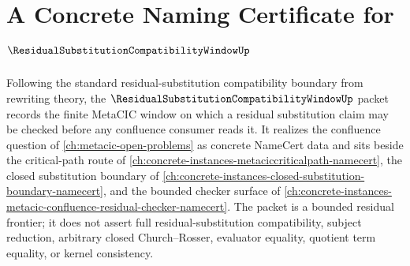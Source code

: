 \chapter{A Concrete Naming Certificate for $\ResidualSubstitutionCompatibilityWindowUp$}
\label{ch:concrete-instances-residual-substitution-compatibility-window-namecert}

Following the standard residual-substitution compatibility boundary from rewriting theory, the $\ResidualSubstitutionCompatibilityWindowUp$ packet records the finite MetaCIC window on which a residual substitution claim may be checked before any confluence consumer reads it. It realizes the confluence question of \autoref{ch:metacic-open-problems} as concrete NameCert data and sits beside the critical-path route of \autoref{ch:concrete-instances-metaciccriticalpath-namecert}, the closed substitution boundary of \autoref{ch:concrete-instances-closed-substitution-boundary-namecert}, and the bounded checker surface of \autoref{ch:concrete-instances-metacic-confluence-residual-checker-namecert}. The packet is a bounded residual frontier; it does not assert full residual-substitution compatibility, subject reduction, arbitrary closed Church--Rosser, evaluator equality, quotient term equality, or kernel consistency.

